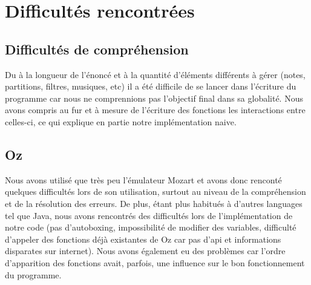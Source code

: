 \documentclass[a4paper,10pt]{article}
\begin{document}
\section{Difficultés rencontrées}

\subsection{Difficultés de compréhension}
Du à la longueur de l'énoncé et à la quantité d'éléments différents à gérer (notes, partitions, filtres, musiques, etc)  il a été difficile de se
lancer dans l'écriture du programme car nous ne comprennions pas l'objectif final dans sa globalité. Nous avons compris au fur et à mesure de 
l'écriture des fonctions les interactions entre celles-ci, ce qui explique en partie notre implémentation naive. 

\subsection{Oz}
Nous avons utilisé que très peu l'émulateur Mozart et avons donc renconté quelques difficultés lors de son utilisation, surtout au niveau de la 
compréhension et de la résolution des erreurs. De plus, étant plus habitués à d'autres languages tel que Java, nous avons rencontrés des 
difficultés lors de l'implémentation de notre code (pas d'autoboxing, impossibilité de modifier des variables, difficulté d'appeler des fonctions
déjà existantes de Oz car pas d'api et informations disparates sur internet). Nous avons également eu des problèmes car l'ordre d'apparition des 
fonctions avait, parfois, une influence sur le bon fonctionnement du programme.
\end{document}
